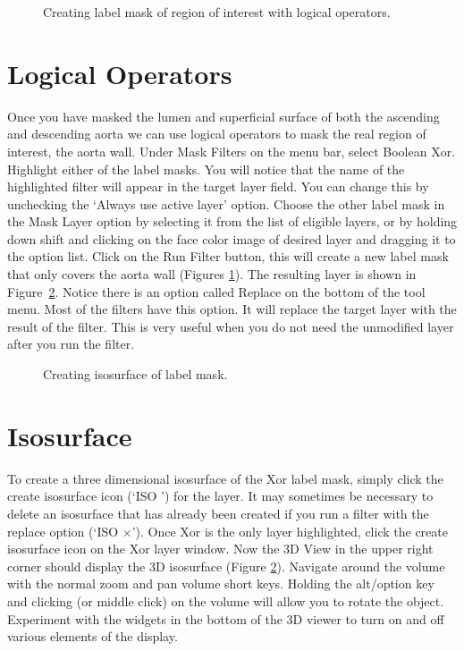 \documentclass[fleqn,11pt,openany]{book}
\begin{document}
\begin{figure}
\caption{Creating label mask of region of interest with logical operators.}\label{fig:logicaloperators}
\end{figure}


\section{Logical Operators}

Once you have masked the lumen and superficial surface of both the ascending and descending aorta we can use logical operators to mask the real region of interest, the aorta wall.
Under Mask Filters on the menu bar, select Boolean Xor.
Highlight either of the label masks.  You will notice that the name of the highlighted filter will appear in the target layer field.  You can change this by unchecking the `Always use active layer' option. Choose the other label mask in the Mask Layer option by selecting it from the list of eligible layers, or by holding down shift and clicking on the face color image of desired layer and dragging it to the option list.  Click on the Run Filter button, this will create a new label mask that only covers the aorta wall (Figures \ref{fig:logicaloperators}).  The resulting layer is shown in Figure~\ref{fig:creatingisosurface}.  Notice there is an option called Replace on the bottom of the tool menu.  Most of the filters have this option.  It will replace the target layer with the result of the filter.  This is very useful when you do not need the unmodified layer after you run the filter.  


\begin{figure}
\caption{Creating isosurface of label mask.}\label{fig:creatingisosurface}
\end{figure}

\section{Isosurface}

To create a three dimensional isosurface of the Xor label mask, simply click the create isosurface icon (`ISO \Forward') for the layer.
It may sometimes be necessary to delete an isosurface that has already been created if you run a filter with the replace option  (`ISO $\times$').
Once Xor is the only layer highlighted, click the create isosurface icon on the Xor layer window.
Now the 3D View in the upper right corner should display the 3D isosurface (Figure \ref{fig:creatingisosurface}).
Navigate around the volume with the normal zoom and pan volume short keys.
Holding the alt/option key and clicking (or middle click) on the volume will allow you to rotate the object.
Experiment with the widgets in the bottom of the 3D viewer to turn on and off various elements of the display.
\end{document}
